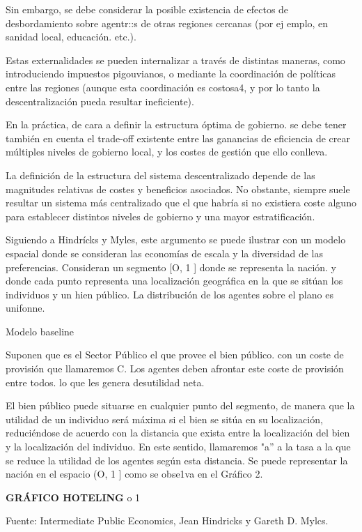 \documentclass[10pt,a4paper]{article}
\begin{document}
Sin embargo, se debe considerar la posible existencia de efectos de desbordamiento sobre agentr::s de otras regiones cercanas (por ej emplo, en sanidad local, educación. etc.).

Estas externalidades se pueden internalizar a través de distintas maneras, como introduciendo impuestos pigouvianos, o mediante la coordinación de políticas entre las regiones (aunque esta coordinación es costosa4, y por lo tanto la descentralización pueda resultar ineficiente).

En la práctica, de cara a definir la estructura óptima de gobierno. se debe tener también en cuenta el trade-off existente entre las ganancias de eficiencia de crear múltiples niveles de gobierno local, y los costes de gestión que ello conlleva.

La definición de la estructura del sistema descentralizado depende de las magnitudes relativas de costes y beneficios asociados. No obstante, siempre suele resultar un sistema más centralizado que el que habría si no existiera coste alguno para establecer distintos niveles de gobierno y una mayor estratificación.

Siguiendo a Hindrícks y Myles, este argumento se puede ilustrar con un modelo espacial donde se consideran las economías de escala y la diversidad de las preferencias. Consideran un segmento [O, 1 ] donde se representa la nación. y donde cada punto representa una localización geográfica en la que se sitúan los individuos y un hien público. La distribución de los agentes sobre el plano es unifonne.

Modelo baseline

Suponen que es el Sector Público el que provee el bien público. con un coste de provisión que llamaremos C. Los agentes deben afrontar este coste de provisión entre todos. lo que les genera desutilidad neta.

El bien público puede situarse en cualquier punto del segmento, de manera que la utilidad de un individuo será máxima si el bien se sitúa en su localización, reduciéndose de acuerdo con la distancia que exista entre la localización del bien y la localización del individuo. En este sentido, llamaremos "a'' a la tasa a la que se reduce la utilidad de los agentes según esta distancia. Se puede representar la nación en el espacio (O, 1 ] como se obse1va en el Gráfico 2.

\textbf{GRÁFICO HOTELING}
o 1

Fuente: Intermediate Public Economics, Jean Hindricks y Gareth D.
Mylcs.
\end{document}
